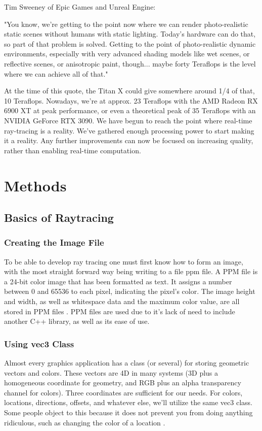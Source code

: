 \documentclass[conference]{IEEEtran}
\newenvironment{quoteindent}{\begin{adjustwidth}{0.7cm}{}}{\end{adjustwidth}}
\begin{document}
Tim Sweeney of Epic Games and Unreal Engine:


\begin{quoteindent}
"You know, we're getting to the point now where we can render photo-realistic static scenes without humans with static lighting. Today's hardware can do that, so part of that problem is solved. Getting to the point of photo-realistic dynamic environments, especially with very advanced shading models like wet scenes, or reflective scenes, or anisotropic paint, though... maybe forty Teraflops is the level where we can achieve all of that."
\end{quoteindent}


At the time of this quote, the Titan X could give somewhere around 1/4 of that, 10 Teraflops. Nowadays, we're at approx. 23 Teraflops with the AMD Radeon RX 6900 XT at peak performance, or even a theoretical peak of 35 Teraflops with an NVIDIA GeForce RTX 3090. We have begun to reach the point where real-time ray-tracing is a reality. We've gathered enough processing power to start making it a reality. Any further improvements can now be focused on increasing quality, rather than enabling real-time computation.

\section{Methods}

\subsection{Basics of Raytracing}
\subsubsection{Creating the Image File}
To be able to develop ray tracing one must first know how to form an image, with the most straight forward way being writing to a file ppm file. A PPM file is a 24-bit color image that has been formatted as text. It assigns a number between 0 and 65536 to each pixel, indicating the pixel's color. The image height and width, as well as whitespace data and the maximum color value, are all stored in PPM files \cite{b5}. PPM files are used due to it’s lack of need to include another C++ library, as well as its ease of use. 

\subsubsection{Using vec3 Class}
Almost every graphics application has a class (or several) for storing geometric vectors and colors. These vectors are 4D in many systems (3D plus a homogeneous coordinate for geometry, and RGB plus an alpha transparency channel for colors). Three coordinates are sufficient for our needs. For colors, locations, directions, offsets, and whatever else, we'll utilize the same vec3 class. Some people object to this because it does not prevent you from doing anything ridiculous, such as changing the color of a location \cite{b6}. 
\end{document}
